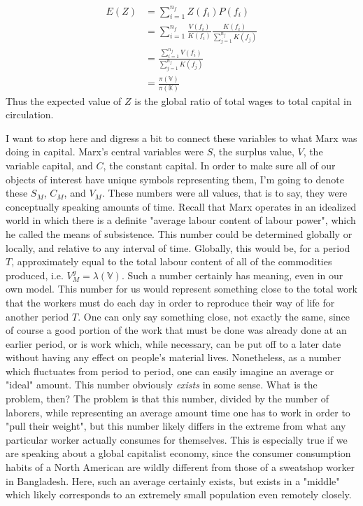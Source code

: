 \documentclass{article}
\theoremstyle{definition}
\theoremstyle{plain}
\theoremstyle{theorem}
\begin{document}
\begin{align}
	E(Z) &= \sum_{i=1}^{n_f} Z(f_i)P(f_i) \\
		&= \sum_{i=1}^{n_f} \frac{V(f_i)}{K(f_i)} \frac{K(f_i)}{\sum_{j=1}^{n_f} K(f_j)} \\
		&= \frac{\sum_{i=1}^{n_f} V(f_i)}{\sum_{j=1}^{n_f} K(f_j)} \\
		&= \frac{\pi(\mathbb{V})}{\pi(\mathbb{K})} 
\end{align}
Thus the expected value of $Z$ is the global ratio of total wages to total capital in circulation. \par 
I want to stop here and digress a bit to connect these variables to what Marx was doing in capital. Marx's central variables were $S$, the surplus value, $V$, the variable capital, and $C$, the constant capital. In order to make sure all of our objects of interest have unique symbols representing them, I'm going to denote these $S_M$, $C_M$, and $V_M$. These numbers were all values, that is to say, they were conceptually speaking amounts of time. Recall that Marx operates in an idealized world in which there is a definite "average labour content of labour power", which he called the means of subsistence. This number could be determined globally or locally, and relative to any interval of time. Globally, this would be, for a period $T$, approximately equal to the total labour content of all of the commodities produced, i.e. $V_M^g = \lambda(\mathbb{V})$. Such a number certainly has meaning, even in our own model. This number for us would represent something close to the total work that the workers must do each day in order to reproduce their way of life for another period $T$. One can only say something close, not exactly the same, since of course a good portion of the work that must be done was already done at an earlier period, or is work which, while necessary, can be put off to a later date without having any effect on people's material lives. Nonetheless, as a number which fluctuates from period to period, one can easily imagine an average or "ideal" amount. This number obviously \textit{exists} in some sense. What is the problem, then? The problem is that this number, divided by the number of laborers, while representing an average amount time one has to work in order to "pull their weight", but this number likely differs in the extreme from what any particular worker actually consumes for themselves. This is especially true if we are speaking about a global capitalist economy, since the consumer consumption habits of a North American are wildly different from those of a sweatshop worker in Bangladesh. Here, such an average certainly exists, but exists in a "middle" which likely corresponds to an extremely small population even remotely closely. \par 
\end{document}
